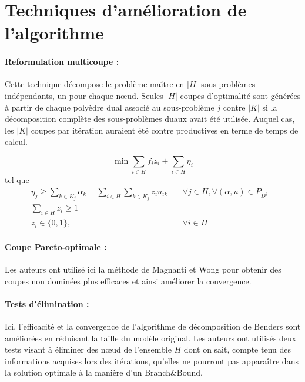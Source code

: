\section{Techniques d’amélioration de l'algorithme}


\paragraph{Reformulation multicoupe : }
Cette technique décompose le problème maître en $|H|$ sous-problèmes indépendants, un pour chaque n\oe ud. Seules $|H|$ coupes d'optimalité sont générées à partir de chaque polyèdre dual associé au sous-problème $j$ contre $|K|$ si la décomposition complète des sous-problèmes duaux avait été utilisée. Auquel cas, les $|K|$ coupes par itération auraient été contre productives en terme de temps de calcul.


\[ \min \sum_{i \in H} f_iz_i + \sum_{i \in H} \eta_i  \]
tel que
\begin{subequations}
	\begin{align}
	\eta_j \ge \sum_{k \in K_j}\alpha_k - \sum_{i \in H}\sum_{k \in K_j} z_iu_{ik} \quad &\forall j \in H, \forall{(\alpha,u) \in P_{D^j}}&\\
	\sum_{i \in H} z_i \ge 1 \quad &&\\
	z_i \in \{0,1\}, \quad & \forall{i \in H}&
	\end{align}
\end{subequations}

\paragraph{Coupe Pareto-optimale : } Les auteurs ont utilisé ici la méthode de Magnanti et Wong \cite[1981]{mw} pour obtenir des coupes non dominées plus efficaces et ainsi améliorer la convergence.

\paragraph{Tests d'élimination : }
Ici, l'efficacité et la convergence de l'algorithme de décomposition de Benders sont améliorées en réduisant la taille du modèle original. Les auteurs ont utilisés deux tests
visant à éliminer des n\oe ud de l'ensemble $H$ dont on sait, compte tenu des informations acquises lors des itérations, qu'elles ne pourront pas apparaître dans la solution optimale à la manière d'un Branch\&Bound.


